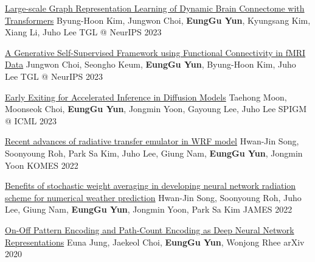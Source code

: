 \documentclass[11pt, a4paper]{cv}
\begin{document}
\vspace{3.0mm}
\begin{cvsubentries}

  \cvpublication
    {\href{https://arxiv.org/abs/2312.14939}{Large-scale Graph Representation Learning of Dynamic Brain Connectome with Transformers}} %
    {Byung-Hoon Kim, Jungwon Choi, \textbf{EungGu Yun}, Kyungsang Kim, Xiang Li, Juho Lee} %
    {TGL @ NeurIPS} %
    {2023} %
    {}

  \cvpublication
    {\href{https://arxiv.org/abs/2312.01994}{A Generative Self-Supervised Framework using Functional Connectivity in fMRI Data}} %
    {Jungwon Choi, Seongho Keum, \textbf{EungGu Yun}, Byung-Hoon Kim, Juho Lee} %
    {TGL @ NeurIPS} %
    {2023} %
    {}

  \cvpublication
    {\href{https://openreview.net/forum?id=nhGdjo9Xed}{Early Exiting for Accelerated Inference in Diffusion Models}} %
    {Taehong Moon, Moonseok Choi, \textbf{EungGu Yun}, Jongmin Yoon, Gayoung Lee, Juho Lee} %
    {SPIGM @ ICML} %
    {2023} %
    {}

\end{cvsubentries}

\vspace{3.0mm}
\begin{cvsubentries}

  \cvpublication
    {\href{https://www.dbpia.co.kr/Journal/articleDetail?nodeId=NODE11162111}{Recent advances of radiative transfer emulator in WRF model}} %
    {Hwan-Jin Song, Soonyoung Roh, Park Sa Kim, Juho Lee, Giung Nam, \textbf{EungGu Yun}, Jongmin Yoon} %
    {KOMES} %
    {2022} %
    {}

  \cvpublication
    {\href{https://doi.org/10.1029/2021MS002921}{Benefits of stochastic weight averaging in developing neural network radiation scheme for numerical weather prediction}} %
    {Hwan-Jin Song, Soonyoung Roh, Juho Lee, Giung Nam, \textbf{EungGu Yun}, Jongmin Yoon, Park Sa Kim} %
    {JAMES} %
    {2022} %
    {}

\end{cvsubentries}

\vspace{3.0mm}
\begin{cvsubentries}

  \cvpublication
    {\href{https://arxiv.org/abs/2401.09518}{On-Off Pattern Encoding and Path-Count Encoding as Deep Neural Network Representations}} %
    {Euna Jung, Jaekeol Choi, \textbf{EungGu Yun}, Wonjong Rhee} %
    {arXiv} %
    {2020} %
    {}

\end{cvsubentries}
\end{document}
